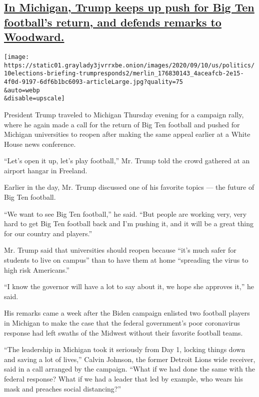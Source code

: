 \hypertarget{in-michigan-trump-keeps-up-push-for-big-ten-footballs-return-and-defends-remarks-to-woodward}{%
\subsection{\texorpdfstring{\protect\hyperlink{in-michigan-trump-keeps-up-push-for-big-ten-footballs-return-and-defends-remarks-to-woodward}{In
Michigan, Trump keeps up push for Big Ten football's return, and defends
remarks to
Woodward.}}{In Michigan, Trump keeps up push for Big Ten football's return, and defends remarks to Woodward.}}\label{in-michigan-trump-keeps-up-push-for-big-ten-footballs-return-and-defends-remarks-to-woodward}}

\texttt{[image: https://static01.graylady3jvrrxbe.onion/images/2020/09/10/us/politics/10elections-briefing-trumpresponds2/merlin\_176830143\_4aceafcb-2e15-4f0d-9197-6df6b1bc6093-articleLarge.jpg?quality=75\\\&auto=webp\\\&disable=upscale]}

President Trump traveled to Michigan Thursday evening for a campaign
rally, where he again made a call for the return of Big Ten football and
pushed for Michigan universities to reopen after making the same appeal
earlier at a White House news conference.

``Let's open it up, let's play football,'' Mr. Trump told the crowd
gathered at an airport hangar in Freeland.

Earlier in the day, Mr. Trump discussed one of his favorite topics ---
the future of Big Ten football.

``We want to see Big Ten football,'' he said. ``But people are working
very, very hard to get Big Ten football back and I'm pushing it, and it
will be a great thing for our country and players.''

Mr. Trump said that universities should reopen because ``it's much safer
for students to live on campus'' than to have them at home ``spreading
the virus to high risk Americans.''

``I know the governor will have a lot to say about it, we hope she
approves it,'' he said.

His remarks came a week after the Biden campaign enlisted two football
players in Michigan to make the case that the federal government's poor
coronavirus response had left swaths of the Midwest without their
favorite football teams.

``The leadership in Michigan took it seriously from Day 1, locking
things down and saving a lot of lives,'' Calvin Johnson, the former
Detroit Lions wide receiver, said in a call arranged by the campaign.
``What if we had done the same with the federal response? What if we had
a leader that led by example, who wears his mask and preaches social
distancing?''


